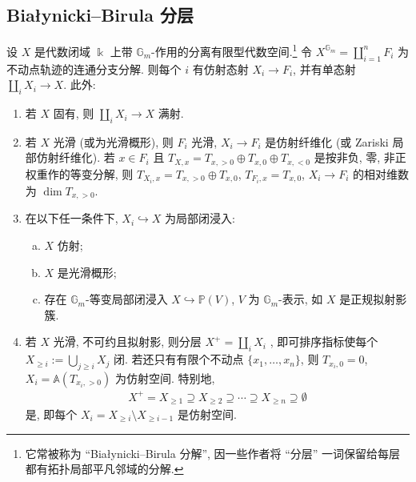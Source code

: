 \subsection{Białynicki--Birula 分层}\label{src:7.8.3-subsection}
\begin{theorem}\label{src:7.8.14}
设 $X$ 是代数闭域 $\Bbbk$ 上带 $\mathbb G_m$-作用的分离有限型代数空间.\footnote{它常被称为 ``Białynicki--Birula 分解'', 因一些作者将 ``分层'' 一词保留给每层都有拓扑局部平凡邻域的分解.} 令 $X^{\mathbb G_m}=\coprod_{i=1}^nF_i$ 为不动点轨迹的连通分支分解. 则每个 $i$ 有仿射态射 $X_i\to F_i$, 并有单态射 $\coprod_iX_i\to X$. 此外:
\begin{enumerate}[(1)]
\item 若 $X$ 固有, 则 $\coprod_iX_i\to X$ 满射.
\item 若 $X$ 光滑 (或为光滑概形), 则 $F_i$ 光滑, $X_i\to F_i$ 是仿射纤维化 (或 Zariski 局部仿射纤维化). 若 $x\in F_i$ 且 $T_{X,x}=T_{x,>0}\oplus T_{x,0}\oplus T_{x,<0}$ 是按非负, 零, 非正权重作的等变分解, 则 $T_{X_i,x}=T_{x,>0}\oplus T_{x,0}$, $T_{F_i,x}=T_{x,0}$, $X_i\to F_i$ 的相对维数为 $\dim T_{x,>0}$.
\item 在以下任一条件下, $X_i\hookrightarrow X$ 为局部闭浸入:
\begin{enumerate}[(a)]
\item $X$ 仿射;
\item $X$ 是光滑概形;
\item 存在 $\mathbb G_m$-等变局部闭浸入 $X\hookrightarrow\mathbb P(V)$, $V$ 为 $\mathbb G_m$-表示, 如 $X$ 是正规拟射影簇.
\end{enumerate}
\item 若 $X$ 光滑, 不可约且拟射影, 则分层 $X^+=\coprod_iX_i$ , 即可排序指标使每个 $X_{\ge i}:=\bigcup_{j\ge i}X_j$ 闭. 若还只有有限个不动点 $\{x_1,\ldots,x_n\}$, 则 $T_{x_i,0}=0$, $X_i=\mathbb A(T_{x_i,>0})$ 为仿射空间. 特别地,
\begin{align*}
X^+=X_{\ge1}\supseteq X_{\ge2}\supseteq\cdots\supseteq X_{\ge n}\supseteq\emptyset
\end{align*}
是, 即每个 $X_i=X_{\ge i}\setminus X_{\ge i-1}$ 是仿射空间.
\end{enumerate}
\end{theorem}
